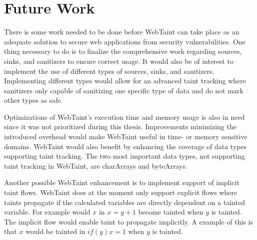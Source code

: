 \chapter{Future Work}
\label{FutureWork}
There is some work needed to be done before WebTaint can take place as an adequate solution to secure web applications from security vulnerabilities. One thing necessary to do is to finalize the comprehensive work regarding sources, sinks, and sanitizers to ensure correct usage. It would also be of interest to implement the use of different types of sources, sinks, and sanitizers. Implementing different types would allow for an advanced taint tracking where sanitizers only capable of sanitizing one specific type of data and do not mark other types as safe. 

Optimizations of WebTaint's execution time and memory usage is also in need since it was not prioritized during this thesis. Improvements minimizing the introduced overhead would make WebTaint useful in time- or memory sensitive domains. WebTaint would also benefit by enhancing the coverage of data types supporting taint tracking. The two most important data types, not supporting taint tracking in WebTaint, are charArrays and byteArrays. 

Another possible WebTaint enhancement is to implement support of implicit taint flows. WebTaint does at the moment only support explicit flows where taints propagate if the calculated variables are directly dependent on a tainted variable. For example would $ x $ in $ x = y + 1 $ become tainted when $ y $ is tainted. The implicit flow would enable taint to propagate implicitly. A example of this is that $ x $ would be tainted in $ if (y) x = 1 $ when $ y $ is tainted.